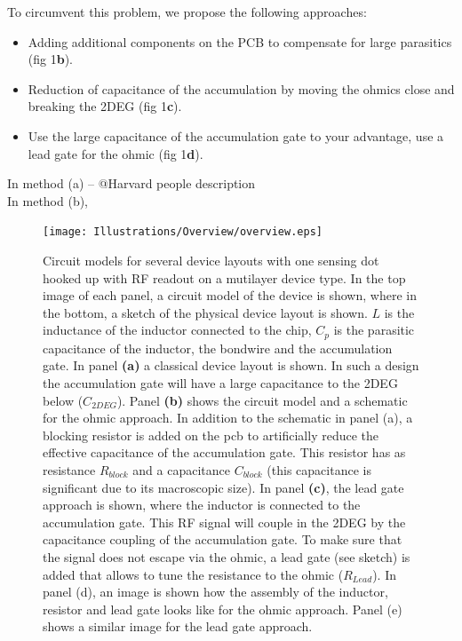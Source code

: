 \documentclass{article}
\begin{document}
	To circumvent this problem, we propose the following approaches:
	\begin{itemize}
		\item Adding additional components on the PCB to compensate for large parasitics (fig 1\textbf{b}).
		\item Reduction of capacitance of the accumulation by moving the ohmics close and breaking the 2DEG (fig 1\textbf{c}).
		\item Use the large capacitance of the accumulation gate to your advantage, use a lead gate for the ohmic (fig 1\textbf{d}).
	\end{itemize}
	In method (a) -- @Harvard people description
	\\
	In method (b), 
	\\
	\color{black}
\begin{figure}
	\texttt{[image: Illustrations/Overview/overview.eps]}
	\caption{Circuit models for several device layouts with one sensing dot hooked up with RF readout on a mutilayer device type.  In the top image of each panel, a circuit model of the device is shown, where in the bottom, a sketch of the physical device layout is shown. $L$ is the inductance of the inductor connected to the chip, $C_p$ is the parasitic capacitance of the inductor, the bondwire and the accumulation gate. In panel \textbf{(a)} a classical device layout is shown. In such a design the accumulation gate will have a large capacitance to the 2DEG below ($C_{2DEG}$). Panel \textbf{(b)} shows the circuit model and a schematic for the ohmic approach. In addition to the schematic in panel (a), a blocking resistor is added on the pcb to artificially reduce the effective capacitance of the accumulation gate. This resistor has as resistance $R_{block}$ and a capacitance $C_{block}$ (this capacitance is significant due to its macroscopic size). In panel \textbf{(c)}, the lead gate approach is shown, where the inductor is connected to the accumulation gate. This RF signal will couple in the 2DEG by the capacitance coupling of the accumulation gate. To make sure that the signal does not escape via the ohmic, a lead gate (see sketch) is added that allows to tune the resistance to the ohmic ($R_{Lead}$). In panel (d), an image is shown how the assembly of the inductor, resistor and lead gate looks like for the ohmic approach. Panel (e) shows a similar image for the lead gate approach.}
	\label{fig:overview}
\end{figure}
\end{document}
